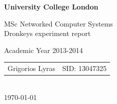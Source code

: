 \begin{titlepage}

\begin{center}
\begin{LARGE}\textbf{
University College London\\}\end{LARGE}
\vspace{2cm}
\begin{Large}
MSc Networked Computer Systems\\
Dronkeys experiment report\\
\end{Large}
\large{Academic Year 2013-2014}\\
\vspace{1cm}
\begin{tabular}{l r}
\Large{Grigorios Lyras}&
\large{SID: 13047325}\\
\end{tabular}\\
\vfill
\large\today\\
\end{center}
\end{titlepage}

